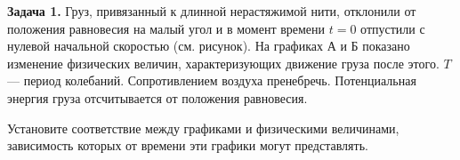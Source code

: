 
\begin{taskbasic}[code={\label{task:oscillations_v1_n6}}]
\textbf{Задача 1.} Груз, привязанный к длинной нерастяжимой нити, отклонили от положения равновесия на малый угол и в момент времени $t = 0$ отпустили с нулевой начальной скоростью (см. рисунок). На графиках А и Б показано изменение физических величин, характеризующих движение груза после этого. $T$ — период колебаний. Сопротивлением воздуха пренебречь. Потенциальная энергия груза отсчитывается от положения равновесия.

\nopagebreak\smallskip
\begin{center}
\end{center}

Установите соответствие между графиками и физическими величинами, зависимость которых от времени эти графики могут представлять.


\end{taskbasic}
